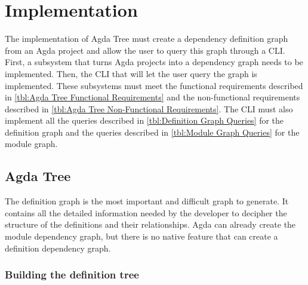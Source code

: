 
\chapter{Implementation} \label{ch:implementation}

The implementation of Agda Tree must create a dependency definition graph from
an Agda project and allow the user to query this graph through a CLI. First, a
subsystem that turns Agda projects into a dependency graph needs to be
implemented. Then, the CLI that will let the user query the graph is
implemented. These subsystems must meet the functional requirements described
in \cref{tbl:Agda Tree Functional Requirements} and the non-functional
requirements described in \cref{tbl:Agda Tree Non-Functional Requirements}. The
CLI must also implement all the queries described in \cref{tbl:Definition Graph
Queries} for the definition graph and the queries described in \cref{tbl:Module
Graph Queries} for the module graph.





\section{Agda Tree}

The definition graph is the most important and difficult graph to generate. It
contains all the detailed information needed by the developer to decipher the
structure of the definitions and their relationships. Agda can already create
the module dependency graph, but there is no native feature that can create a
definition dependency graph. 

\subsection{Building the definition tree}


